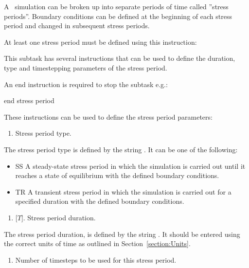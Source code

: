 \label{section:StressPeriods}
A \mfus\ simulation can be broken up into separate periods of time called ''stress periods''.  Boundary conditions can be defined at the beginning of each stress period and changed in subsequent stress periods.

At least one stress period must be defined using this instruction:

    {This subtask has several instructions that can be used to define the duration, type and timestepping parameters of the stress period.

    An end instruction is required to stop the subtask e.g.:

    {\Large \sf end stress period}
    }

These instructions can be used to define the stress period parameters:

    {
        \squish
        \begin{enumerate}
        \item {}  Stress period type.
        \end{enumerate}
        The stress period type is defined by the string .  It can be one of the following:
        \begin{itemize}
            \item \textsf{SS} A steady-state stress period in which the simulation is carried out until it reaches a state of equilibrium with the defined boundary conditions.
            \item \textsf{TR} A transient stress period in which the simulation is carried out for a specified duration with the defined boundary conditions.
        \end{itemize}
        \squish
    }

    {
        \squish
        \begin{enumerate}
        \item {} [$T$].  Stress period duration.
        \end{enumerate}
        The stress period duration, is defined by the string .  It should be entered using the correct units of time as outlined in Section~\ref{section:Units}.
    }

    {
        \squish
        \begin{enumerate}
        \item {}  Number of timesteps to be used for this stress period.
        \end{enumerate}
        \squish
    }

